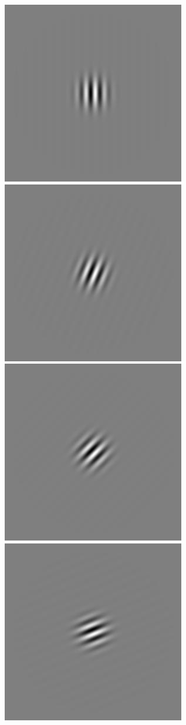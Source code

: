 \begin{figure}
\begin{center}
 \includegraphics[scale=0.1]{ch4/figures/rGabor3_0.jpg}
 \includegraphics[scale=0.1]{ch4/figures/rGabor3_1.jpg}
 \includegraphics[scale=0.1]{ch4/figures/rGabor3_2.jpg}
 \includegraphics[scale=0.1]{ch4/figures/rGabor3_3.jpg}

\end{center}
\end{figure}
